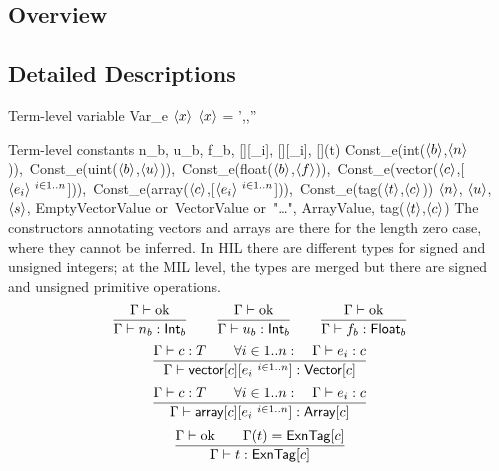 \documentclass[12pt,twoside,fleqn]{article}
\begin{document}
\subsection{Overview}

\subsection{Detailed Descriptions}

  {Term-level variable}
  {\evar}
  {Var\_e $\langle{x}\rangle$}
  {$\langle{x}\rangle$}
  {}
  {\irule
    {\validcontext{\context}\qquad
     \context = \context',\evar{:}\ctype,\context''}
    {\validexpression{\context}{\evar}{\ctype}}}

  {Term-level constants}
  {n_b, u_b, f_b,
   [\constructor][\expression_i],
   [\constructor][\expression_i],
   [\constructor](t)}
  {Const\_e(int($\langle{b}\rangle$,$\langle{n}\rangle$)),\
   Const\_e(uint($\langle{b}\rangle$,$\langle{u}\rangle$)),\
   Const\_e(float($\langle{b}\rangle$,$\langle{f}\rangle$)),\
   Const\_e(vector($\langle{c}\rangle$,[$\langle{e_i}\rangle\ {}^{i\in 1..n}$])),\ 
   Const\_e(array($\langle{c}\rangle$,[$\langle{e_i}\rangle\ {}^{i\in 1..n}$])),\
   Const\_e(tag($\langle{t}\rangle$,$\langle{c}\rangle$))}
  {$\langle{n}\rangle$, $\langle{u}\rangle$, $\langle{s}\rangle$, EmptyVectorValue 
   \mbox{or}\ VectorValue \mbox{or}\ "\ldots", ArrayValue,
   tag($\langle{t}\rangle$,$\langle{c}\rangle$)}
  {The constructors annotating vectors and arrays are there for the
   length zero case, where they cannot be inferred.  In HIL there are
   different types for signed and unsigned integers; at the MIL level,
   the types are merged but there are signed and unsigned primitive
   operations.  }
  {\[
   \frac{{\Gamma}\vdash\mbox{ok}}
        {\Gamma\vdash n_b : \mathsf{Int}_b}
   \qquad
   \frac{{\Gamma}\vdash\mbox{ok}}
        {\Gamma\vdash u_b : \mathsf{Int}_b}
   \qquad
   \frac{{\Gamma}\vdash\mbox{ok}}
        {\Gamma\vdash f_b : \mathsf{Float}_b}
   \]
   \[
   \frac{\Gamma\vdash c : T\qquad
         \forall i\in1..n:\quad
             \Gamma\vdash e_i : c}
        {\Gamma\vdash \mathsf{vector}[c][e_i\ {}^{i\in 1..n}] : \mathsf{Vector}[c]}
   \]
   \[
   \frac{\Gamma\vdash c : T\qquad
         \forall i\in1..n:\quad
             \Gamma\vdash e_i : c}
        {\Gamma\vdash \mathsf{array}[c][e_i\ {}^{i\in 1..n}] : \mathsf{Array}[c]}
   \]
   \[
   \frac{{\Gamma}\vdash\mbox{ok}\qquad
         \Gamma(t) = \mathsf{ExnTag}[c]}
        {\Gamma\vdash t : \mathsf{ExnTag}[c]}
   \]
  }
\end{document}
